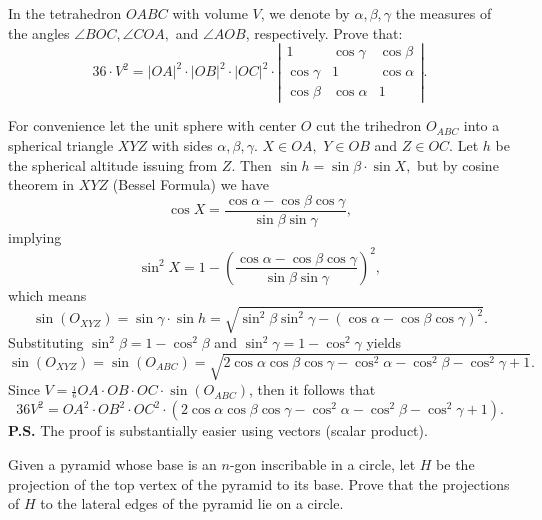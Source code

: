 \documentclass[12pt,a4paper]{memoir}
\theoremstyle{definition}
\begin{document}
\begin{question}
	In the tetrahedron $OABC$ with volume $V$, we denote by $\alpha,\beta,\gamma$ the measures of the angles $\angle BOC,\angle COA,$ and $\angle AOB$, respectively. Prove that:
	\[36\cdot V^{2}=|OA|^{2}\cdot |OB|^{2}\cdot |OC|^{2}\cdot \left|\begin{array}{ccc}1&{\cos\gamma}&{\cos\beta}\\ {\cos\gamma}&1&{\cos\alpha}\\ {\cos\beta}&{\cos\alpha}&1\end{array}\right| .\]
\end{question}





\begin{solution}[name={Solution by Luis González}] 
	For convenience let the unit sphere with center $O$ cut the trihedron $O_{ABC}$ into a spherical triangle $XYZ$ with sides $\alpha,\beta,\gamma.$ $X \in OA,$ $Y \in OB$ and $Z \in OC.$ Let $h$ be the spherical altitude issuing from $Z.$ Then $\sin h=\sin \beta \cdot \sin X,$ but by cosine theorem in $XYZ$ (Bessel Formula) we have
	\[\cos X=\frac{\cos \alpha- \cos \beta \cos \gamma}{\sin \beta \sin \gamma},\]
	implying
	\[\sin^2 X=1-\left (\frac{\cos \alpha- \cos \beta \cos \gamma}{\sin \beta \sin \gamma} \right)^2,\]
	which means
	\[\sin (O_{XYZ})= \sin \gamma \cdot \sin h=\sqrt{ \sin^2 \beta \sin^2 \gamma-(\cos \alpha- \cos \beta \cos \gamma)^2}.\]
	Substituting $\sin^2 \beta=1- \cos^2 \beta$ and $\sin^2 \gamma=1- \cos^2 \gamma$ yields
	\[\sin (O_{XYZ})=\sin (O_{ABC})= \sqrt{2\cos \alpha \cos \beta \cos \gamma- \cos^2 \alpha-\cos^2 \beta-\cos^2 \gamma+1}.\]
	Since $V=\frac{_1}{^6} OA \cdot OB \cdot OC \cdot \sin (O_{ABC})$, then it follows that
	\[36V^2=OA^2 \cdot OB^2 \cdot OC^2 \cdot (2\cos \alpha \cos \beta \cos \gamma- \cos^2 \alpha-\cos^2 \beta-\cos^2 \gamma+1).\]
	\textbf{P.S.} The proof is substantially easier using vectors (scalar product).
\end{solution}






\begin{question}
	Given a pyramid whose base is an $n$-gon inscribable in a circle, let $H$ be the projection of the top vertex of the pyramid to its base. Prove that the projections of $H$ to the lateral edges of the pyramid lie on a circle.
\end{question}
\end{document}
